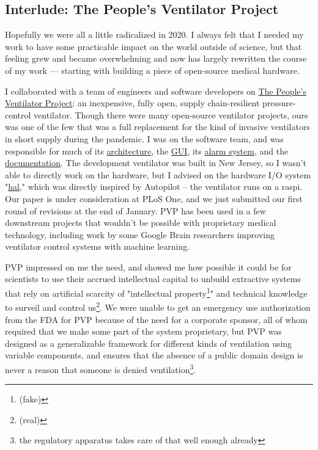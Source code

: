 \subsection{Interlude: The People's Ventilator Project}

Hopefully we were all a little radicalized in 2020. I always felt that I needed my work to have some practicable impact on the world outside of science, but that feeling grew and became overwhelming and now has largely rewritten the course of my work --- starting with building a piece of open-source medical hardware.

\begin{done}
I collaborated with a team of engineers and software developers on \href{https://www.peoplesvent.org/en/latest/}{The People's Ventilator Project}\cite{lachancePVP1PeopleVentilator2020}: an inexpensive, fully open, supply chain-resilient pressure-control ventilator. Though there were many open-source ventilator projects, ours was one of the few that was a full replacement for the kind of invasive ventilators in short supply during the pandemic. I was on the software team, and was responsible for much of its \href{https://www.peoplesvent.org/en/latest/software/software_overview.html}{architecture}, the \href{https://www.peoplesvent.org/en/latest/software/gui/index.html}{GUI}, its \href{https://www.peoplesvent.org/en/latest/software/alarm/index.html}{alarm system}, and the \href{https://github.com/CohenLabPrinceton/pvp/tree/master/_docs}{documentation}. The development ventilator was built in New Jersey, so I wasn't able to directly work on the hardware, but I advised on the hardware I/O system "\href{https://github.com/CohenLabPrinceton/pvp/blob/master/pvp/io/hal.py}{hal}," which  was directly inspired by Autopilot -- the ventilator runs on a raspi. Our paper is under consideration at PLoS One, and we just submitted our first round of revisions at the end of January. PVP has been used in a few downstream projects that wouldn't be possible with proprietary medical technology, including work by some Google Brain researchers improving ventilator control systems with machine learning\cite{suoMachineLearningMechanical2022}.
\end{done}

PVP impressed on me the need, and showed me how possible it could be for scientists to use their accrued intellectual capital to unbuild extractive systems that rely on artificial scarcity of "intellectual property\footnote{(fake)}" and technical knowledge to surveil and control us\footnote{(real)}. We were unable to get an emergency use authorization from the FDA for PVP because of the need for a corporate sponsor, all of whom required that we make some part of the system proprietary, but PVP was designed as a generalizable framework for different kinds of ventilation using variable components, and ensures that the absence of a public domain design is never a reason that someone is denied ventilation\footnote{the regulatory apparatus takes care of that well enough already}.
